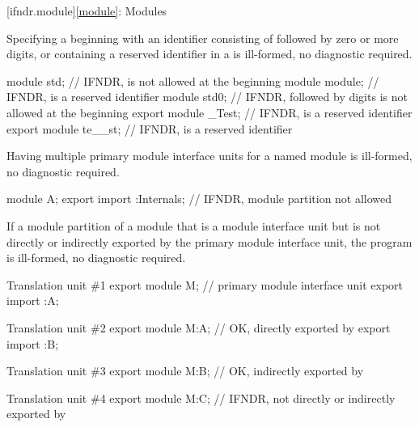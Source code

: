 [ifndr.module]{\ref*{module}: Modules}


\pnum
Specifying a 
beginning with an identifier
consisting of  followed by zero or more digits,
or containing a reserved identifier
in a 
is ill-formed, no diagnostic required.

\pnum
\begin{example}
\begin{codeblock}
module std;             // IFNDR,  is not allowed at the beginning
module module;          // IFNDR,  is a reserved identifier
module std0;            // IFNDR,  followed by digits is not allowed at the beginning
export module _Test;    // IFNDR,  is a reserved identifier
export module te__st;   // IFNDR,  is a reserved identifier
\end{codeblock}
\end{example}


\pnum
Having multiple primary module interface units
for a named module
is ill-formed, no diagnostic required.

\pnum
\begin{example}
\begin{codeblock}
module A;
export import :Internals;       // IFNDR, module partition not allowed
\end{codeblock}
\end{example}


\pnum
If a module partition of a module
that is a module interface unit
but is not directly or indirectly exported
by the primary module interface unit,
the program is ill-formed, no diagnostic required.

\pnum
\begin{example}
\begin{codeblocktu}{Translation unit \#1}
export module M;    // primary module interface unit
export import :A;
\end{codeblocktu}
\begin{codeblocktu}{Translation unit \#2}
export module M:A;  // OK, directly exported by 
export import :B;
\end{codeblocktu}
\begin{codeblocktu}{Translation unit \#3}
export module M:B;  // OK, indirectly exported by 
\end{codeblocktu}
\begin{codeblocktu}{Translation unit \#4}
export module M:C;  // IFNDR, not directly or indirectly exported by 
\end{codeblocktu}
\end{example}

